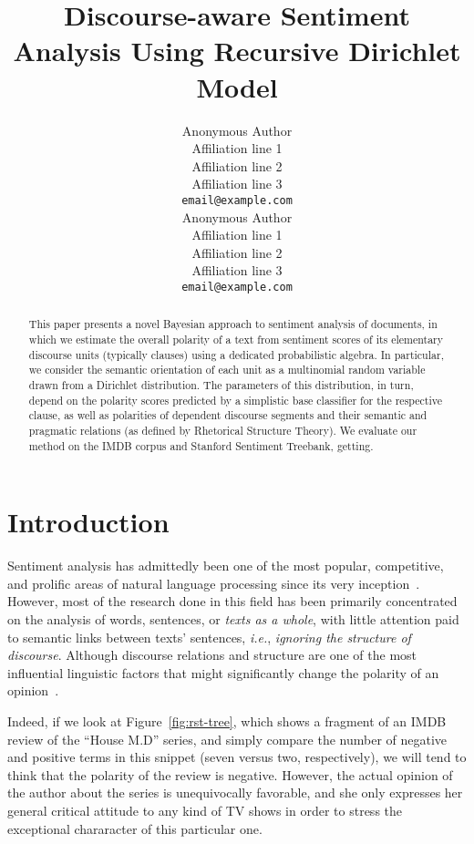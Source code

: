 \documentclass[11pt]{article}
\title{Discourse-aware Sentiment Analysis Using Recursive Dirichlet
  Model}
\author{Anonymous Author\\
  Affiliation line 1 \\
  Affiliation line 2 \\
  Affiliation line 3 \\
  {\tt email@example.com} \\\And{}
  Anonymous Author\\
  Affiliation line 1 \\
  Affiliation line 2 \\
  Affiliation line 3 \\
  {\tt email@example.com} \\}
\date{}
\newcommand{\ienocomma}{\textit{i.e.}}
\newcommand{\ie}{\ienocomma,}
\begin{document}
\maketitle
\begin{abstract}
  This paper presents a novel Bayesian approach to sentiment analysis
  of documents, in which we estimate the overall polarity of a text
  from sentiment scores of its elementary discourse units (typically
  clauses) using a dedicated probabilistic algebra.  In particular, we
  consider the semantic orientation of each unit as a multinomial
  random variable drawn from a Dirichlet distribution.  The parameters
  of this distribution, in turn, depend on the polarity scores
  predicted by a simplistic base classifier for the respective clause,
  as well as polarities of dependent discourse segments and their
  semantic and pragmatic relations (as defined by Rhetorical Structure
  Theory).  We evaluate our method on the IMDB corpus and Stanford
  Sentiment Treebank, getting.
\end{abstract}

\section{Introduction}\label{intro}

Sentiment analysis has admittedly been one of the most popular,
competitive, and prolific areas of natural language processing since
its very inception~\cite[pp.~1--5]{Liu:12}.  However, most
of the research done in this field has been primarily concentrated on
the analysis of words, sentences, or \emph{texts as a whole}, with
little attention paid to semantic links between texts' sentences,
\ie{} \emph{ignoring the structure of discourse}.  Although discourse
relations and structure are one of the most influential linguistic
factors that might significantly change the polarity of an
opinion~\cite{Polanyi:06}.

Indeed, if we look at Figure~\ref{fig:rst-tree}, which shows a
fragment of an IMDB review of the ``House M.D'' series, and simply
compare the number of negative and positive terms in this snippet
(seven versus two, respectively), we will tend to think that the
polarity of the review is negative.  However, the actual opinion of
the author about the series is unequivocally favorable, and she only
expresses her general critical attitude to any kind of TV shows in
order to stress the exceptional chararacter of this particular one.
\end{document}
